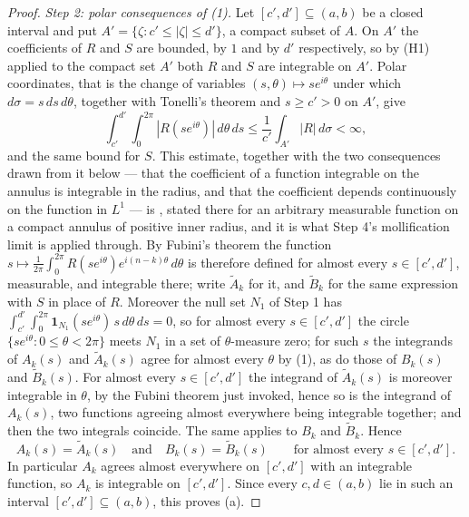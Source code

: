 \begin{proof}
\emph{Step 2: polar consequences of (1).}  Let $[c',d']\subseteq(a,b)$ be a
closed interval and put
$A'=\{\zeta:c'\le|\zeta|\le d'\}$, a compact subset of $A$.  On $A'$ the
coefficients of $R$ and $S$ are bounded, by $1$ and by $d'$ respectively, so by
(H1) applied to the compact set $A'$ both $R$ and $S$ are integrable on $A'$.
Polar coordinates, that is the change of variables $(s,\theta)\mapsto
se^{i\theta}$ under which $d\sigma=s\,ds\,d\theta$, together with Tonelli's
theorem and $s\ge c'>0$ on $A'$, give
\begin{equation}\tag{2}
  \int_{c'}^{d'}\!\!\int_0^{2\pi}|R(se^{i\theta})|\,d\theta\,ds
  \le\frac1{c'}\int_{A'}|R|\,d\sigma<\infty,
\end{equation}
and the same bound for $S$.  This estimate, together with the two consequences
drawn from it below --- that the coefficient of a function integrable on the
annulus is integrable in the radius, and that the coefficient depends
continuously on the function in $L^1$ --- is
, stated there for an arbitrary
measurable function on a compact annulus of positive inner radius, and it is
what Step 4's mollification limit is applied through.  By Fubini's theorem the
function
$s\mapsto\frac1{2\pi}\int_0^{2\pi}R(se^{i\theta})e^{i(n-k)\theta}\,d\theta$ is
therefore defined for almost every $s\in[c',d']$, measurable, and integrable
there; write $\widetilde A_k$ for it, and $\widetilde B_k$ for the same
expression with $S$ in place of $R$.  Moreover the null set $N_1$ of Step 1 has
$\int_{c'}^{d'}\int_0^{2\pi}\mathbf1_{N_1}(se^{i\theta})\,s\,d\theta\,ds=0$,
so for almost every $s\in[c',d']$ the circle $\{se^{i\theta}:0\le\theta<2\pi\}$
meets $N_1$ in a set of $\theta$-measure zero; for such $s$ the integrands of
$A_k(s)$ and $\widetilde A_k(s)$ agree for almost every $\theta$ by (1), as do
those of $B_k(s)$ and $\widetilde B_k(s)$.  For almost every
$s\in[c',d']$ the integrand of $\widetilde A_k(s)$ is moreover integrable in
$\theta$, by the Fubini theorem just invoked, hence so is the integrand of
$A_k(s)$, two functions agreeing almost everywhere being integrable together;
and then the two integrals coincide.  The same applies to $B_k$ and
$\widetilde B_k$.  Hence
\begin{equation}\tag{3}
  A_k(s)=\widetilde A_k(s)\quad\text{and}\quad B_k(s)=\widetilde B_k(s)
  \qquad\text{for almost every }s\in[c',d'] .
\end{equation}
In particular $A_k$ agrees almost everywhere on $[c',d']$ with an integrable
function, so $A_k$ is integrable on $[c',d']$.  Since every $c,d\in(a,b)$ lie
in such an interval $[c',d']\subseteq(a,b)$, this proves (a).


\end{proof}

